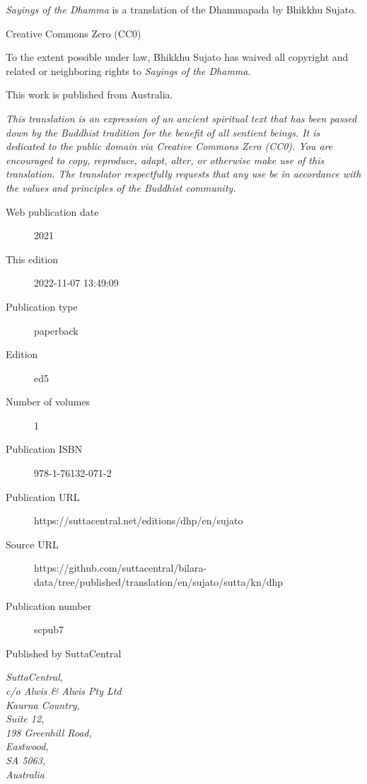 \documentclass[12pt,openany]{book}%
\begin{document}
\begin{footnotesize}

\textit{Sayings of the Dhamma} is a translation of the Dhammapada by Bhikkhu Sujato.

\medskip

Creative Commons Zero (CC0)

To the extent possible under law, Bhikkhu Sujato has waived all copyright and related or neighboring rights to \textit{Sayings of the Dhamma}.

\medskip

This work is published from Australia.

\begin{center}
\textit{This translation is an expression of an ancient spiritual text that has been passed down by the Buddhist tradition for the benefit of all sentient beings. It is dedicated to the public domain via Creative Commons Zero (CC0). You are encouraged to copy, reproduce, adapt, alter, or otherwise make use of this translation. The translator respectfully requests that any use be in accordance with the values and principles of the Buddhist community.}
\end{center}

\medskip

\begin{description}
    \item[Web publication date] 2021
    \item[This edition] 2022-11-07 13:49:09
    \item[Publication type] paperback
    \item[Edition] ed5
    \item[Number of volumes] 1
    \item[Publication ISBN] 978-1-76132-071-2
    \item[Publication URL] https://suttacentral.net/editions/dhp/en/sujato
    \item[Source URL] https://github.com/suttacentral/bilara-data/tree/published/translation/en/sujato/sutta/kn/dhp
    \item[Publication number] scpub7
\end{description}

\medskip

Published by SuttaCentral

\medskip

\textit{SuttaCentral,\\
c/o Alwis \& Alwis Pty Ltd\\
Kaurna Country,\\
Suite 12,\\
198 Greenhill Road,\\
Eastwood,\\
SA 5063,\\
Australia}

\end{footnotesize}
\end{document}
